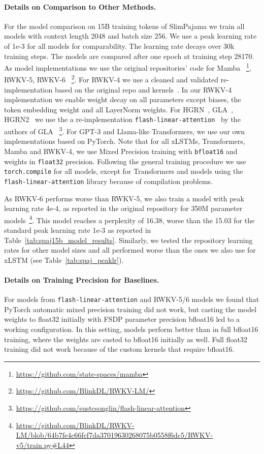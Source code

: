 \documentclass[dvipsnames]{article}
\begin{document}
\begin{appendix}
\paragraph{Details on Comparison to Other Methods.}
\label{sec:appExpComparison}
For the model comparison on 15B training tokens of SlimPajama we train all models with context length 2048 and batch size 256.
We use a peak learning rate of 1e-3 for all models for comparability. 
The learning rate decays over 30k training steps. 
The models are compared after one epoch at training step 28170. 
As model implementations we use the original repositories' code for Mamba~\citep{Gu:24arxiv} \footnote{\url{https://github.com/state-spaces/mamba}}, RWKV-5, RWKV-6~\citep{Peng:24arxivshort} \footnote{\url{https://github.com/BlinkDL/RWKV-LM/}}. 
For RWKV-4 we use a cleaned and validated re-implementation based on the original repo and kernels~\citep{Peng:23arxivshort}. 
In our RWKV-4 implementation we enable weight decay on all parameters except biases, the token embedding weight and all LayerNorm weights.
For HGRN~\citep{Qin:23}, GLA~\citep{Yang:23arxiv}, HGRN2~\citep{Qin:24arxiv} we use the a re-implementation \texttt{flash-linear-attention}~\citep{Yang:24} by the authors of GLA~\citep{Yang:23arxiv,Yang:24} \footnote{\url{https://github.com/sustcsonglin/flash-linear-attention}}. 
For GPT-3 and Llama-like Transformers, we use our own implementations based on PyTorch. Note that for all xLSTMs, Transformers, Mamba and RWKV-4, we use Mixed Precision training with \texttt{bfloat16} and weights in \texttt{float32} precision.
Following the general training procedure we use \texttt{torch.compile} for all models, except for Transformers and models using the \texttt{flash-linear-attention} library because of compilation problems.

As RWKV-6 performs worse than RWKV-5, we also train a model with peak learning rate 4e-4, as reported in the original repository for 350M parameter models~\footnote{\url{https://github.com/BlinkDL/RWKV-LM/blob/64b7fe4c66fcf7da37019630268075b0558f6dc5/RWKV-v5/train.py\#L44}}. This model reaches a perplexity of 16.38, worse than the 15.03 for the standard peak learning rate 1e-3 as reported in Table~\ref{tab:spaj15b_model_results}. Similarly, we tested the repository learning rates for other model sizes and all performed worse than the ones we also use for xLSTM (see Table~\ref{tab:spaj_peaklr}).

\paragraph{Details on Training Precision for Baselines.}
For models from \texttt{flash-linear-attention} and
RWKV-5/6 models we found that PyTorch automatic mixed precision training did not work, but
casting the model weights to float32 initially with FSDP parameter precision bfloat16 led to a
working configuration. In this setting, models perform better than in full bfloat16 training, where the weights are casted to bfloat16 initially as well. Full float32 training did not work because of the custom kernels that require bfloat16.


\end{appendix}
\end{document}

